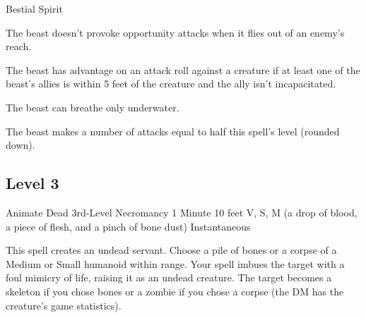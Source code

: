 {\begin{DndMonster}[width=0.5\textwidth]{Bestial Spirit}
	\renewcommand{\AbilityScoreSpacer}{~}
    \DndMonsterAbilityScores[
		str = 18,
		dex = 11,
		con = 16,
		int = 4,
		wis = 14,
		cha = 5,
    ]

    \DndMonsterDetails[
        senses = {Darkvision 60 ft., Passive Perception 12},
        languages = {understands the languages you speak},
        challenge = 1,
    ]
    
    The beast doesn’t provoke opportunity attacks when it flies out of an enemy’s reach.
    
    The beast has advantage on an attack roll against a creature if at least one of the beast’s allies is within 5 feet of the creature and the ally isn’t incapacitated.
    
    The beast can breathe only underwater.
	
	The beast makes a number of attacks equal to half this spell’s level (rounded down).
	
	\DndMonsterAttack[
      name=Maul,
      distance=melee, %
      mod=your spell attack modifier,
      reach=5,
      targets=one target,
      dmg=\DndDice{1d8} + 4 + the spell's level,
      dmg-type=piercing,
    ]
\end{DndMonster}

\subsection*{Level 3}

\DndSpellHeader
  {Animate Dead}
  {3rd-Level Necromancy}
  {1 Minute}
  {10 feet}
  {V, S, M (a drop of blood, a piece of flesh, and a pinch of bone dust)}
  {Instantaneous}

This spell creates an undead servant. Choose a pile of bones or a corpse of a Medium or Small humanoid within range. Your spell imbues the target with a foul mimicry of life, raising it as an undead creature. The target becomes a skeleton if you chose bones or a zombie if you chose a corpse (the DM has the creature’s game statistics).

}
